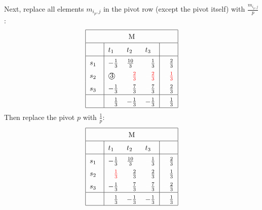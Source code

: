 \documentclass[11pt]{article}
\begin{document}
Next, replace all elements $m_{i_p,j}$ in the pivot row (except the
pivot itself) with $\frac{m_{i_p,j}}{p}$:
\begin{equation*}
\renewcommand{\arraystretch}{1.5}
\begin{tabular}{ |p{0.5cm}|p{0.5cm} p{0.5cm} p{0.5cm}|p{0.5cm}| }
\hline
\multicolumn{5}{|c|}{M} \\
\hline
\textcolor{white}{.}& $t_1$ & $t_2$ & $t_3$ & $\textcolor{white}{-}$\\
\hline
$s_1$ & $-\frac{1}{3}$ & $\frac{10}{3}$ & $\textcolor{white}{-}$$\frac{1}{3}$ & $\textcolor{white}{-}$$\frac{2}{3}$\\
$s_2$ & \textcircled{3} & $\textcolor{white}{-}$\textcolor{red}{$\frac{2}{3}$} & $\textcolor{white}{-}$\textcolor{red}{$\frac{2}{3}$} & $\textcolor{white}{-}$\textcolor{red}{$\frac{1}{3}$}\\
$s_3$ & $-\frac{1}{3}$ & $\textcolor{white}{-}$$\frac{7}{3}$ & $\textcolor{white}{-}$$\frac{7}{3}$ & $\textcolor{white}{-}$$\frac{2}{3}$\\
\hline
$\textcolor{white}{-}$ & $\textcolor{white}{-}$$\frac{1}{3}$ & $-\frac{1}{3}$ & $-\frac{1}{3}$ & $\textcolor{white}{-}$$\frac{1}{3}$\\
\hline
\end{tabular}
\end{equation*}
Then replace the pivot $p$ with $\frac{1}{p}$:
\begin{equation*}
\renewcommand{\arraystretch}{1.5}
\begin{tabular}{ |p{0.5cm}|p{0.5cm} p{0.5cm} p{0.5cm}|p{0.5cm}| }
\hline
\multicolumn{5}{|c|}{M} \\
\hline
\textcolor{white}{.}& $t_1$ & $t_2$ & $t_3$ & $\textcolor{white}{-}$\\
\hline
$s_1$ & $-\frac{1}{3}$ & $\frac{10}{3}$ & $\textcolor{white}{-}$$\frac{1}{3}$ & $\textcolor{white}{-}$$\frac{2}{3}$\\
$s_2$ & $\textcolor{white}{-}$\textcolor{red}{$\frac{1}{3}$} & $\textcolor{white}{-}$$\frac{2}{3}$ & $\textcolor{white}{-}$$\frac{2}{3}$ & $\textcolor{white}{-}$$\frac{1}{3}$\\
$s_3$ & $-\frac{1}{3}$ & $\textcolor{white}{-}$$\frac{7}{3}$ & $\textcolor{white}{-}$$\frac{7}{3}$ & $\textcolor{white}{-}$$\frac{2}{3}$\\
\hline
$\textcolor{white}{-}$ & $\textcolor{white}{-}$$\frac{1}{3}$ & $-\frac{1}{3}$ & $-\frac{1}{3}$ & $\textcolor{white}{-}$$\frac{1}{3}$\\
\hline
\end{tabular}
\end{equation*}
\end{document}
